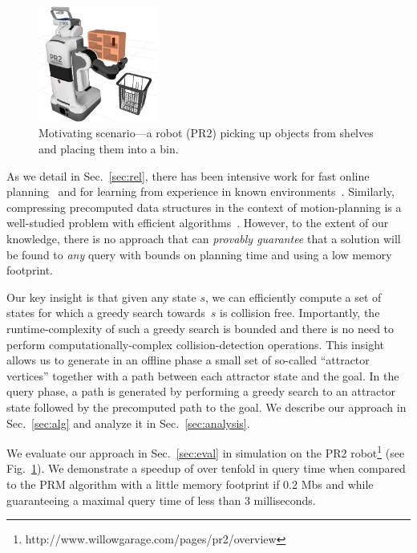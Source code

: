\documentclass[letterpaper]{article} %
\newcommand{\update}[1]{{\color{magenta}#1}}
\begin{document}
\begin{figure}[tb]
  \centering
    \includegraphics[width=0.35\textwidth]{PR2.png}
  \caption{
  Motivating scenario---a robot (PR2) picking up objects from shelves and placing them into a bin.
}
    \label{fig:PR2}
\end{figure}

As we detail in Sec.~\ref{sec:rel}, there has been intensive work 
for fast online planning~\cite{LA18} and 
for learning from experience in known environments~\cite{PCCL12,PDCL13,BAG12,CSMOC15}.
Similarly, compressing precomputed data structures in the context of motion-planning is a well-studied problem with efficient algorithms~\cite{SSAH14,DB14}.
However, to the extent of our knowledge, there is no approach that can \emph{provably guarantee} that a solution will be found to \emph{any} query with bounds on planning time and using a low memory footprint.


\update{
Our key insight is that given any state $s$, we can efficiently compute a set of states for which a greedy search towards~$s$ is collision free.
Importantly, the runtime-complexity of such a greedy search is bounded and there is no need to perform computationally-complex collision-detection operations. 
This insight allows us to generate in an offline phase a small set of so-called ``attractor vertices'' together with a path between each attractor state and the goal.
In the query phase, a path is generated by performing a greedy search to an attractor state followed by the precomputed path to the goal.
We describe our approach in Sec.~\ref{sec:alg} and analyze it in Sec.~\ref{sec:analysis}.
}

We evaluate our approach in Sec.~\ref{sec:eval} in simulation on the PR2 robot\footnote{http://www.willowgarage.com/pages/pr2/overview} (see Fig.~\ref{fig:PR2}).
We demonstrate a speedup of over tenfold in query time when compared to the \textsf{PRM} algorithm with a little memory footprint if 0.2 Mbs and while guaranteeing a maximal query time of less than 3 milliseconds.
\end{document}
